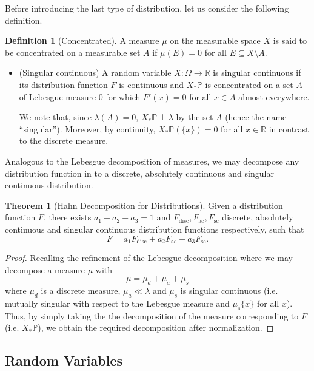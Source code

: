 \documentclass[]{article}
\theoremstyle{definition}
\newtheorem{theorem}{Theorem}
\theoremstyle{definition}
\newtheorem{definition}{Definition}[section]
\begin{document}
Before introducing the last type of distribution, let us consider the following 
definition.

\begin{definition}[Concentrated]
  A measure \(\mu\) on the measurable space \(X\) is said to be concentrated on a 
  measurable set \(A\) if \(\mu(E) = 0\) for all \(E \subseteq X \setminus A\).
\end{definition}

\begin{itemize}
  \item (Singular continuous) A random variable \(X : \Omega \to \mathbb{R}\) is 
  singular continuous if its distribution function \(F\) is continuous and 
  \(X_* \mathbb{P}\) is concentrated on a set \(A\) of Lebesgue measure 0 for 
  which \(F'(x) = 0\) for all \(x \in A\) almost everywhere. 

  We note that, since \(\lambda(A) = 0\), \(X_* \mathbb{P} \perp \lambda\) by 
  the set \(A\) (hence the name ``singular''). Moreover, by continuity, 
  \(X_* \mathbb{P}(\{x\}) = 0\) for all \(x \in \mathbb{R}\) in contrast to the 
  discrete measure.
\end{itemize}

Analogous to the Lebesgue decomposition of measures, we may decompose any distribution 
function in to a discrete, absolutely continuous and singular continuous distribution.

\begin{theorem}[Hahn Decomposition for Distributions]
  Given a distribution function \(F\), there exists \(a_1 + a_2 + a_3 = 1\) 
  and \(F_{\text{disc}}, F_{\text{ac}}, F_{\text{sc}}\) discrete, absolutely 
  continuous and singular continuous distribution functions respectively, such that 
  \[F = a_1 F_{\text{disc}} + a_2 F_{\text{ac}} + a_3 F_{\text{sc}}.\]
\end{theorem}
\begin{proof}
  Recalling the refinement of the Lebesgue decomposition where we may decompose 
  a measure \(\mu\) with 
  \[\mu = \mu_d + \mu_a + \mu_s\]
  where \(\mu_d\) is a discrete measure, \(\mu_a \ll \lambda\) and \(\mu_s\) is 
  singular continuous (i.e. mutually singular with respect to the Lebesgue measure 
  and \(\mu_s\{x\}\) for all \(x\)). Thus, by simply taking the the decomposition 
  of the measure corresponding to \(F\) (i.e. \(X_*\mathbb{P}\)), we obtain the 
  required decomposition after normalization.
\end{proof}

\subsection{Random Variables}
\end{document}
